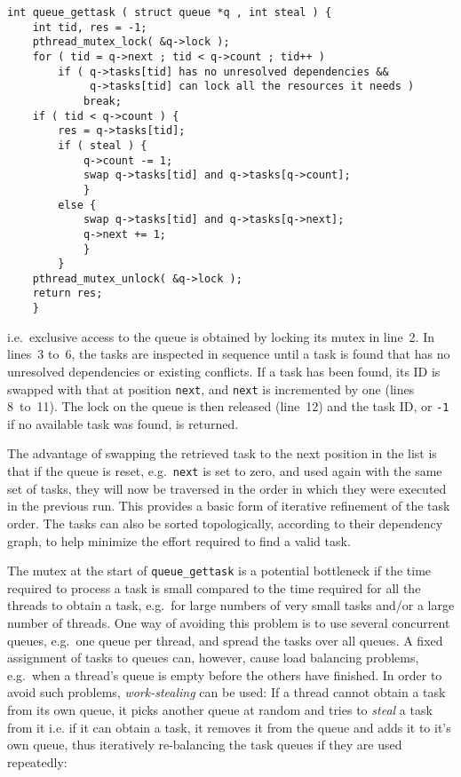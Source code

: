 \documentclass[final]{siamltex}
\begin{document}
\begin{center}\begin{minipage}{0.8\textwidth}
    \begin{lstlisting}
int queue_gettask ( struct queue *q , int steal ) {
    int tid, res = -1;
    pthread_mutex_lock( &q->lock );
    for ( tid = q->next ; tid < q->count ; tid++ )
        if ( q->tasks[tid] has no unresolved dependencies &&
             q->tasks[tid] can lock all the resources it needs )
            break;
    if ( tid < q->count ) {
        res = q->tasks[tid];
        if ( steal ) {
            q->count -= 1;
            swap q->tasks[tid] and q->tasks[q->count];
            }
        else {
            swap q->tasks[tid] and q->tasks[q->next];
            q->next += 1;
            }
        }
    pthread_mutex_unlock( &q->lock );
    return res;
    }
    \end{lstlisting}
\end{minipage}\end{center}

\noindent i.e.~exclusive access to the queue is obtained by locking
its mutex in line~2. In lines~3 to~6, the tasks are inspected
in sequence until a task is found that has no unresolved
dependencies or existing conflicts.
If a task has been found, its ID is swapped with that at
position {\tt next}, and {\tt next} is incremented by one
(lines 8~to~11).
The lock on the queue is then released (line~12) and
the task ID, or {\tt -1} if no available task was found, is
returned.

The advantage of swapping the retrieved task to the next
position in the list is that if the queue is reset, e.g.~{\tt next}
is set to zero, and used again with the same set of tasks,
they will now be traversed in the order in which they were
executed in the previous run.
This provides a basic form of iterative refinement of the task
order.
The tasks can also be sorted topologically, according to their
dependency graph, to help minimize the effort required to find
a valid task.

The mutex at the start of {\tt queue\_gettask} is a potential
bottleneck if the time required to process a task is small
compared to the time required for all the threads to obtain
a task, e.g.~for large numbers of very small tasks and/or
a large number of threads.
One way of avoiding this problem is to use several concurrent
queues, e.g.~one queue per thread, and spread the tasks over
all queues.
A fixed assignment of tasks to queues can, however,
cause load balancing problems, e.g.~when a thread's queue is
empty before the others have finished.
In order to avoid such problems, {\em work-stealing} can be used:
If a thread cannot obtain a task from its own queue, it picks
another queue at random and tries to {\em steal} a task from it
i.e. if it can obtain a task, it removes it from the queue and
adds it to it's own queue, thus iteratively re-balancing
the task queues if they are used repeatedly:
\end{document}
